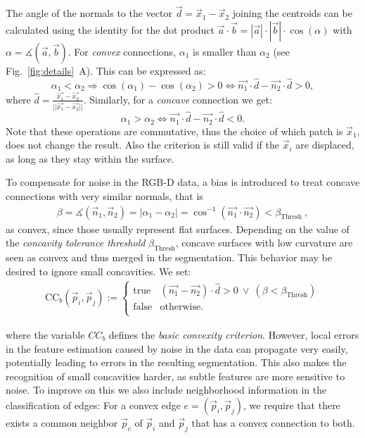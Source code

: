 The angle of the normals to the vector $\vec d = \vec x_1-\vec x_2$ joining the centroids can be calculated using the identity for the dot product $\vec a\cdot \vec b = |\vec a|\cdot |\vec b|\cdot \cos(\alpha)$ with $\alpha = \measuredangle(\vec a,\vec b)$. For \textit{convex} connections, $\alpha_1$ is smaller than $\alpha_2$ (see Fig.~\ref{fig:details}~A). This can be expressed as:
  \begin{equation*}
    \alpha_1 < \alpha_2 \Rightarrow \cos(\alpha_1) - \cos(\alpha_2) > 0 \Leftrightarrow \vec {n_1}\cdot \hat d - \vec {n_2}\cdot \hat d > 0,
  \end{equation*}
where $\hat d = \frac{\vec{x_1}-\vec{x_2}}{||\vec{x_1}-\vec{x_2}||}$. Similarly, for a \textit{concave} connection we get:
  \begin{equation*}
    \alpha_1 > \alpha_2 \Leftrightarrow \vec {n_1}\cdot \hat d - \vec {n_2}\cdot \hat d < 0.
  \end{equation*}
Note that these operations are commutative, thus the choice of which patch is $\vec x_1$, does not change the result. Also the criterion is still valid if the $\vec x_i$ are displaced, as long as they stay within the surface.

To compensate for noise in the RGB-D data, a bias is introduced to treat concave connections with very similar normals, that is
\begin{align*}
  \beta = \measuredangle(\vec n_1,\vec n_2) = |\alpha_1-\alpha_2| = \cos^{-1}(\vec{n_1}\cdot \vec{n_2}) < \beta_\text{Thresh}~,
\end{align*}
as convex, since those usually represent flat surfaces. Depending on the value of the \textit{concavity tolerance threshold} $\beta_\text{Thresh}$, concave surfaces with low curvature are seen as convex and thus merged in the segmentation. This behavior may be desired to ignore small concavities. We set:
\begin{align}
  \text{CC}_b(\vec p_i, \vec p_j) :=
  \left\{\begin{array}{lc}
          \text{true} & \left(\vec {n_1} - \vec {n_2} \right) \cdot \hat d  > 0~ \lor~ (  \beta < \beta_\text{Thresh} )\\
            \text{false} & \text{otherwise.}\\
          \end{array} \right.
  \label{eqn:CC}
\end{align}

where the variable $CC_b$ defines the {\em basic convexity criterion}. However, local errors in the feature estimation caused by noise in the data can propagate very easily, potentially leading to errors in the resulting segmentation. This also makes the recognition of small concavities harder, as subtle features are more sensitive to noise. To improve on this we also include neighborhood information in the classification of edges: For a convex edge $e=(\vec p_i, \vec p_j)$, we require that there exists a common neighbor $\vec p_c$ of $\vec p_i$ and $\vec p_j$ that has a convex connection to both.


